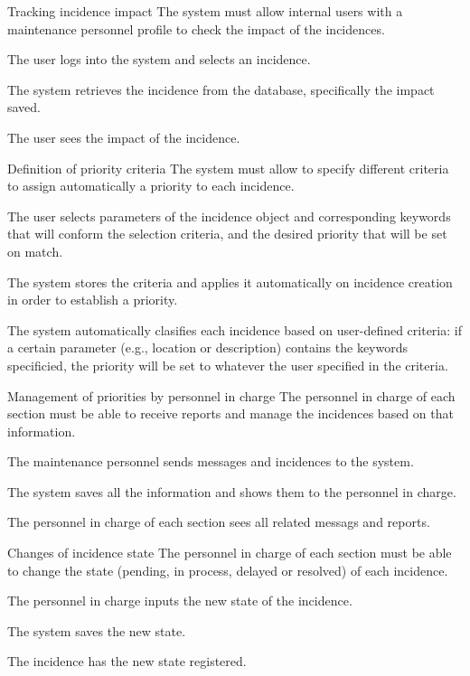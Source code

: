 
\begin{requirement}{Tracking incidence impact}
\reqdesc The system must allow internal users with a maintenance personnel profile to check the impact of the incidences.

\reqin The user logs into the system and selects an incidence.

\reqsteps The system retrieves the incidence from the database, specifically the impact saved.

\reqout The user sees the impact of the incidence.
\end{requirement}


\begin{requirement}{Definition of priority criteria}
\reqdesc The system must allow to specify different criteria to assign automatically a priority to each incidence.

\reqin The user selects parameters of the incidence object and corresponding keywords that will conform the selection criteria, and the desired priority that will be set on match.

\reqsteps The system stores the criteria and applies it automatically on incidence creation in order to establish a priority.

\reqout The system automatically clasifies each incidence based on user-defined criteria: if a certain parameter (e.g., location or description) contains the keywords specificied, the priority will be set to whatever the user specified in the criteria.
\end{requirement}


\begin{requirement}{Management of priorities by personnel in charge}
\reqdesc The personnel in charge of each section must be able to receive reports and manage the incidences based on that information.

\reqin The maintenance personnel sends messages and incidences to the system.

\reqsteps The system saves all the information and shows them to the personnel in charge.

\reqout The personnel in charge of each section sees all related messags and reports.
\end{requirement}


\begin{requirement}{Changes of incidence state}
\reqdesc The personnel in charge of each section must be able to change the state (pending, in process, delayed or resolved) of each incidence.

\reqin The personnel in charge inputs the new state of the incidence.

\reqsteps The system saves the new state.

\reqout The incidence has the new state registered.
\end{requirement}

